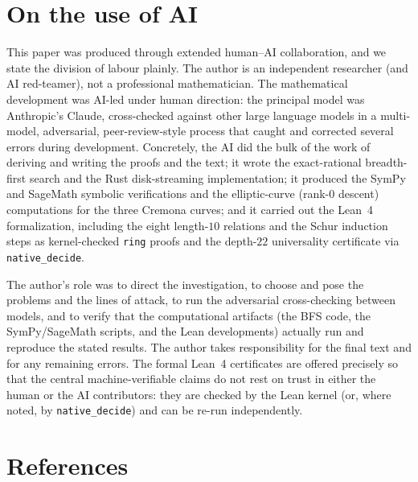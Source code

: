 \documentclass[11pt,a4paper]{article}
\theoremstyle{remark}
\theoremstyle{plain}
\begin{document}
\section*{On the use of AI}

This paper was produced through extended human--AI collaboration, and we
state the division of labour plainly.  The author is an independent
researcher (and AI red-teamer), not a professional mathematician.  The
mathematical development was AI-led under human direction: the principal
model was Anthropic's Claude, cross-checked against other large language
models in a multi-model, adversarial, peer-review-style process that
caught and corrected several errors during development.  Concretely, the
AI did the bulk of the work of deriving and writing the proofs and the
text; it wrote the exact-rational breadth-first search and the Rust
disk-streaming implementation; it produced the SymPy and SageMath
symbolic verifications and the elliptic-curve (rank-$0$ descent)
computations for the three Cremona curves; and it carried out the Lean~4
formalization, including the eight length-$10$ relations and the Schur
induction steps as kernel-checked \texttt{ring} proofs and the depth-$22$
universality certificate via \texttt{native\_decide}.

The author's role was to direct the investigation, to choose and pose
the problems and the lines of attack, to run the adversarial
cross-checking between models, and to verify that the computational
artifacts (the BFS code, the SymPy/SageMath scripts, and the Lean
developments) actually run and reproduce the stated results.  The author
takes responsibility for the final text and for any remaining errors.
The formal Lean~4 certificates are offered precisely so that the central
machine-verifiable claims do not rest on trust in either the human or the
AI contributors: they are checked by the Lean kernel (or, where noted,
by \texttt{native\_decide}) and can be re-run independently.

\section*{References}
\end{document}
